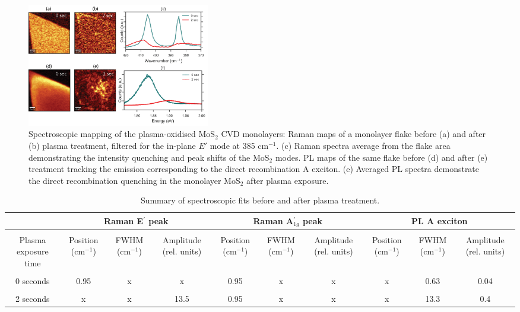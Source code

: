\documentclass[%
 reprint,
superscriptaddress,
 amsmath,amssymb,
 aps,
prb,
]{revtex4-1}
\begin{document}
\begin{center}
\begin{figure}[!htb]
\includegraphics[width=80mm]{Fig_5_spectroscopies}
\caption{Spectroscopic mapping of the plasma-oxidised MoS$_2$ CVD monolayers: Raman maps of a monolayer flake before (a) and after (b) plasma treatment, filtered for the in-plane $E'$ mode at 385 cm$^{-1}$. (c) Raman spectra average from the flake area demonstrating the intensity quenching and peak shifts of the MoS$_2$ modes. PL maps of the same flake before (d) and after (e) treatment tracking the emission corresponding to the direct recombination A exciton. (e) Averaged PL spectra demonstrate the direct recombination quenching in the monolayer MoS$_2$ after plasma exposure.  }
\end{figure}
\end{center}


\onecolumngrid

\begin{table}
\centering
\caption{Summary of spectroscopic fits before and after plasma treatment.}
\label{my-label}
\begin{adjustbox}{width=\textwidth}\begin{tabular}{@{}cccccccccc@{}}
\toprule
                       & \multicolumn{3}{c}{Raman E$^{'}$ peak} & \multicolumn{3}{c}{Raman A$^{'}_{1g}$ peak} & \multicolumn{3}{c}{PL A exciton} \\ \hline \hline \\
\multicolumn{1}{c}{Plasma exposure time} &  Position (cm$^{-1}$) & FWHM (cm$^{-1}$) & Amplitude (rel. units) & Position (cm$^{-1}$) & FWHM (cm$^{-1}$) & Amplitude (rel. units) &  Position (cm$^{-1}$) & FWHM (cm$^{-1}$) & Amplitude (rel. units)\\ \hline \\
\multicolumn{1}{c}{0 seconds} &   0.95   & x & x     & 0.95   & x & x     &       x   &     0.63      &      0.04        \\ \hline \\
\multicolumn{1}{c}{2 seconds} &     x & x&  13.5    & 0.95   & x & x     &     x    & 13.3          &  0.4             \\ \hline
\end{tabular}
\end{adjustbox}
\end{table}
\end{document}
